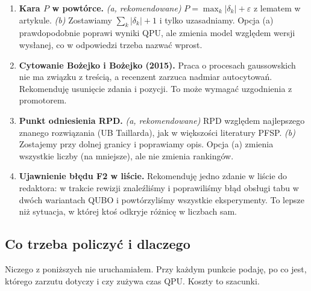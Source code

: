 \documentclass[11pt,a4paper]{article}
\begin{document}
\begin{enumerate}[label=\textbf{D\arabic*.},leftmargin=2.2em]
\item \textbf{Kara $P$ w powtórce.} \emph{(a, rekomendowane)} $P=\max_k|\delta_k|+\varepsilon$ z lematem w artykule. \emph{(b)} Zostawiamy $\sum_k|\delta_k|+1$ i tylko uzasadniamy. Opcja (a) prawdopodobnie poprawi wyniki QPU, ale zmienia model względem wersji wysłanej, co w odpowiedzi trzeba nazwać wprost.
\item \textbf{Cytowanie Bożejko i Bożejko (2015).} Praca o procesach gaussowskich nie ma związku z treścią, a recenzent zarzuca nadmiar autocytowań. Rekomenduję usunięcie zdania i pozycji. To może wymagać uzgodnienia z promotorem.
\item \textbf{Punkt odniesienia RPD.} \emph{(a, rekomendowane)} RPD względem najlepszego znanego rozwiązania (UB Taillarda), jak w większości literatury PFSP. \emph{(b)} Zostajemy przy dolnej granicy i poprawiamy opis. Opcja (a) zmienia wszystkie liczby (na mniejsze), ale nie zmienia rankingów.
\item \textbf{Ujawnienie błędu F2 w liście.} Rekomenduję jedno zdanie w liście do redaktora: w trakcie rewizji znaleźliśmy i poprawiliśmy błąd obsługi tabu w dwóch wariantach QUBO i powtórzyliśmy wszystkie eksperymenty. To lepsze niż sytuacja, w której ktoś odkryje różnicę w liczbach sam.
\end{enumerate}

\subsection{Co trzeba policzyć i dlaczego}\label{sec:calc}

Niczego z poniższych nie uruchamiałem. Przy każdym punkcie podaję, po co jest, którego zarzutu dotyczy i czy zużywa czas QPU. Koszty to szacunki.
\end{document}
